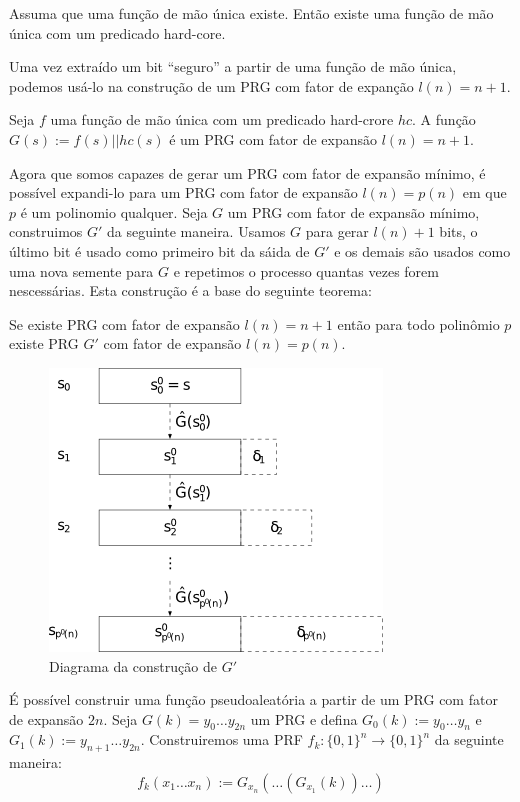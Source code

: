 \begin{theorem}
  Assuma que uma função de mão única existe. Então existe uma função de mão única com um predicado hard-core.
\end{theorem}

Uma vez extraído um bit ``seguro'' a partir de uma função de mão única, podemos usá-lo na construção de um PRG com fator de expanção $l(n) = n + 1$.

\begin{theorem}
  Seja $f$ uma função de mão única com um predicado hard-crore $hc$.
A função $G(s) := f(s)||hc(s)$ é um PRG com fator de expansão $l(n) = n+1$.
\end{theorem}

Agora que somos capazes de gerar um PRG com fator de expansão mínimo, é possível expandi-lo para um PRG com fator de expansão $l(n) = p(n)$ em que $p$ é um polinomio qualquer.
Seja $G$ um PRG com fator de expansão mínimo, construimos $G'$ da seguinte maneira.
Usamos $G$ para gerar $l(n)+1$ bits, o último bit é usado como primeiro bit da sáida de $G'$ e os demais são usados como uma nova semente para $G$ e repetimos o processo quantas vezes forem nescessárias.
Esta construção é a base do seguinte teorema:


\begin{theorem}
  Se existe PRG com fator de expansão $l(n) = n + 1$ então para todo polinômio $p$ existe PRG $G'$ com fator de expansão $l(n) = p(n)$.
\end{theorem}

\begin{figure}[htbp]
  \centering
    \includegraphics[width=.5\textwidth]{imagens/OWF-PRG.png}
  \caption{Diagrama da construção de $G'$}
  \label{fig:owf-prg}
\end{figure}

É possível construir uma função pseudoaleatória a partir de um PRG com fator de expansão $2n$.
Seja $G(k) = y_0 \dots y_{2n}$ um PRG e defina $G_0(k) := y_0 \dots y_n$ e $G_1(k) := y_{n+1} \dots y_{2n}$.
Construiremos uma PRF $f_k: \{0,1\}^n \to \{0,1\}^n$ da seguinte maneira:
\begin{displaymath}
  f_k(x_1 \dots x_n) := G_{x_n}(\dots (G_{x_1}(k))\dots)
\end{displaymath}

